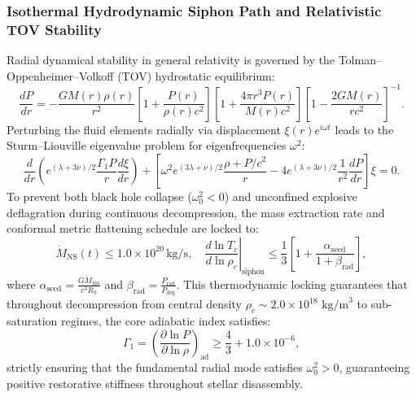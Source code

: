 \documentclass[11pt,onecolumn]{article}
\begin{document}
\subsubsection{Isothermal Hydrodynamic Siphon Path and Relativistic TOV Stability}
Radial dynamical stability in general relativity is governed by the Tolman--Oppenheimer--Volkoff (TOV) hydrostatic equilibrium:
\begin{equation}
    \frac{dP}{dr} = -\frac{G M(r)\rho(r)}{r^2} \left[ 1 + \frac{P(r)}{\rho(r) c^2} \right] \left[ 1 + \frac{4\pi r^3 P(r)}{M(r) c^2} \right] \left[ 1 - \frac{2GM(r)}{r c^2} \right]^{-1}.
    \label{eq:tov_equilibrium}
\end{equation}
Perturbing the fluid elements radially via displacement $\xi(r) e^{i\omega t}$ leads to the Sturm--Liouville eigenvalue problem for eigenfrequencies $\omega^2$:
\begin{equation}
    \frac{d}{dr}\left( e^{(\lambda + 3\nu)/2} \frac{\Gamma_1 P}{r} \frac{d\xi}{dr} \right) + \left[ \omega^2 e^{(3\lambda + \nu)/2} \frac{\rho + P/c^2}{r} - 4 e^{(\lambda + 3\nu)/2} \frac{1}{r^2}\frac{dP}{dr} \right] \xi = 0.
    \label{eq:radial_pulsation_eigenvalue}
\end{equation}
To prevent both black hole collapse ($\omega_0^2 < 0$) and unconfined explosive deflagration during continuous decompression, the mass extraction rate and conformal metric flattening schedule are locked to:
\begin{equation}
    \dot{M}_{\text{NS}}(t) \le 1.0 \times 10^{20}\,\text{kg/s}, \quad \left.\frac{d\ln T_c}{d\ln \rho_c}\right|_{\text{siphon}} \le \frac{1}{3}\left[1 + \frac{\alpha_{\text{seed}}}{1 + \beta_{\text{rad}}}\right],
    \label{eq:isothermal_siphon_constraint}
\end{equation}
where $\alpha_{\text{seed}} = \frac{G \dot{M}_{\text{NS}}}{c^3 R_h}$ and $\beta_{\text{rad}} = \frac{P_{\text{rad}}}{P_{\text{deg}}}$. This thermodynamic locking guarantees that throughout decompression from central density $\rho_c \sim 2.0 \times 10^{18}\text{ kg/m}^3$ to sub-saturation regimes, the core adiabatic index satisfies:
\begin{equation}
    \Gamma_1 = \left(\frac{\partial \ln P}{\partial \ln \rho}\right)_{\text{ad}} \ge \frac{4}{3} + 1.0 \times 10^{-6},
    \label{eq:gamma1_stability_floor}
\end{equation}
strictly ensuring that the fundamental radial mode satisfies $\omega_0^2 > 0$, guaranteeing positive restorative stiffness throughout stellar disassembly.
\end{document}
